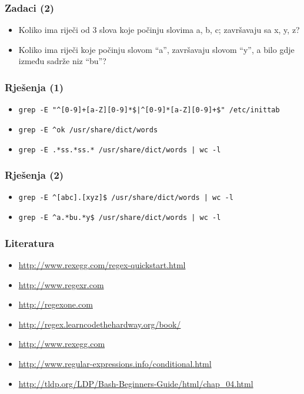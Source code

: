 \documentclass[table,usenames,dvipsnames]{beamer}
\newcommand{\shell}[1]{\texttt{#1}}
\begin{document}
\begin{frame}[t]
\frametitle{Zadaci (2)}
\begin{itemize}
  \item Koliko ima riječi od 3 slova koje počinju slovima a, b, c; 
        završavaju sa x, y, z?
  \item Koliko ima riječi koje počinju slovom ``a'', završavaju slovom 
        ``y'', a bilo gdje između sadrže niz ``bu''?
\end{itemize}
\end{frame}

\begin{frame}[t]
\frametitle{Rješenja (1)}
\begin{itemize}
  \item \shell{grep -E "\textasciicircum{}[0-9]+[a-Z][0-9]*\$|\textasciicircum{}[0-9]*[a-Z][0-9]+\$" /etc/inittab}
  \item \shell{grep -E \textasciicircum{}ok /usr/share/dict/words}
  \item \shell{grep -E .*ss.*ss.* /usr/share/dict/words | wc -l}
\end{itemize}
\end{frame}

\begin{frame}[t]
\frametitle{Rješenja (2)}
\begin{itemize}
  \item \shell{grep -E \textasciicircum{}[abc].[xyz]\$ /usr/share/dict/words | wc -l}
  \item \shell{grep -E \textasciicircum{}a.*bu.*y\$ /usr/share/dict/words | wc -l}
\end{itemize}
\end{frame}

\begin{frame}[t]
\frametitle{Literatura}
\begin{itemize}
  \item[] \small\url{http://www.rexegg.com/regex-quickstart.html}
  \item[] \small\url{http://www.regexr.com}
  \item[] \small\url{http://regexone.com}
  \item[] \small\url{http://regex.learncodethehardway.org/book/}
  \item[] \small\url{http://www.rexegg.com}
  \item[] \small\url{http://www.regular-expressions.info/conditional.html} 
  \item[] \small\url{http://tldp.org/LDP/Bash-Beginners-Guide/html/chap_04.html}
\end{itemize}
\end{frame}
\end{document}
